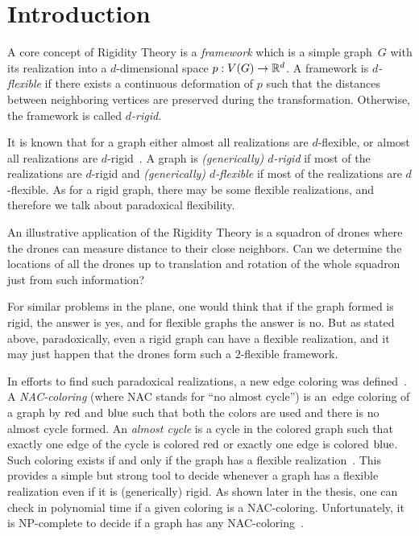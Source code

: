 
\chapter*{Introduction}
\setcounter{page}{1}


A core concept of Rigidity Theory is a \emph{framework} which is
a simple graph~\(G\) with its realization
into a \(d\)-dimensional space \(p: V(G) \to \mathbb{R}^d\).
A framework is \emph{\( d \)-flexible} if there exists
a continuous deformation of \( p \) such that
the distances between neighboring vertices are preserved during the transformation.
Otherwise, the framework is called \emph{\( d \)-rigid}.

It is known that for a graph either almost all realizations are \( d \)-flexible,
or almost all realizations are \( d \)-rigid~\cite{generically_rigid_graphs}.
A graph is \emph{(generically) \( d \)-rigid} if most of the realizations are \( d \)-rigid
and \emph{(generically) \( d \)-flexible} if most of the realizations are \( d \)-flexible.
%
As for a rigid graph,
there may be some flexible realizations,
and therefore we talk about paradoxical flexibility.

An illustrative application of the Rigidity Theory is a squadron of drones
where the drones can measure distance to their close neighbors.
Can we determine the locations of all the drones
up to translation and rotation of the whole squadron
just from such information?

For similar problems in the plane,
one would think that if the graph formed is rigid, the answer is yes, and
for flexible graphs the answer is no.
But as stated above, paradoxically, even a rigid graph can have a flexible realization,
and it may just happen that the drones form such a \( 2 \)-flexible framework.

In efforts to find such paradoxical realizations,
a new edge coloring was defined~\cite{legersky_original}.
A \emph{NAC-coloring} (where NAC stands for ``no almost cycle'')
is an~edge coloring of a graph by \( \text{red} \) and \( \text{blue} \)
such that both the colors are used and there is no almost cycle formed.
An \emph{almost cycle} is a cycle in the colored graph such that exactly one
edge of the cycle is colored \( \text{red} \) or exactly one edge is colored \( \text{blue} \).
Such coloring exists if and only if the graph has a flexible realization~\cite{legersky_original}.
This provides a simple but strong tool to decide whenever a graph has
a flexible realization even if it is (generically) rigid.
As shown later in the thesis, one can check in polynomial time
if a given coloring is a NAC-coloring.
Unfortunately, it is NP-complete to decide if a graph has any NAC-coloring~\cite{np_complete}.

